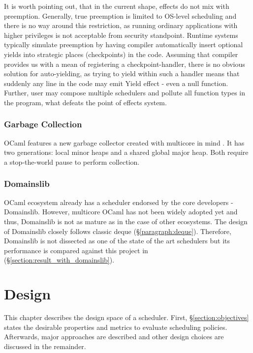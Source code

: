\documentclass[12pt,a4paper,twoside]{report}
\begin{document}
\label{paragraph:ocaml_preemption}
It is worth pointing out, that in the current shape, effects do not mix with preemption. Generally, true preemption is limited to OS-level scheduling and there is no way around this restriction, as running ordinary applications with higher privileges is not acceptable from security standpoint. Runtime systems typically simulate preemption by having compiler automatically insert optional yields into strategic places (checkpoints) in the code. Assuming that compiler provides us with a mean of registering a checkpoint-handler, there is no obvious solution for auto-yielding, as trying to yield within such a handler means that suddenly any line in the code may emit Yield effect - even a null function. Further, user may compose multiple schedulers and pollute all function types in the program, what defeats the point of effects system. 



\subsection{Garbage Collection}
OCaml features a new garbage collector created with multicore in mind \cite{Sivaramakrishnan2020}. It has two generations: local minor heaps and a shared global major heap. Both require a stop-the-world pause to perform collection. 

\subsection{Domainslib}

OCaml ecosystem already has a scheduler endorsed by the core developers \cite{ocamlmul59:online} - Domainslib. However, multicore OCaml has not been widely adopted yet and thus, Domainslib is not as mature as in the case of other ecosystems. The design of Domainslib closely follows classic deque (\S\ref{paragraph:deque}). Therefore, Domainslib is not dissected as one of the state of the art schedulers but its performance is compared against this project in (\S\ref{section:result_with_domainslib}).

\chapter{Design}
This chapter describes the design space of a scheduler. First, \S\ref{section:objectives} states the desirable properties and metrics to evaluate scheduling policies. Afterwards, major approaches are described and other design choices are discussed in the remainder. 
\end{document}
